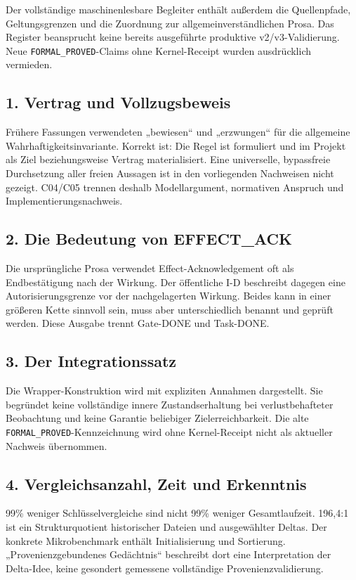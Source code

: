 \vspace{3mm}
Der vollständige maschinenlesbare Begleiter enthält außerdem die Quellenpfade, Geltungsgrenzen und die Zuordnung zur allgemeinverständlichen Prosa. Das Register beansprucht keine bereits ausgeführte produktive v2/v3-Validierung. Neue \texttt{FORMAL\_PROVED}-Claims ohne Kernel-Receipt wurden ausdrücklich vermieden.

\begin{cols}
\subsection*{1. Vertrag und Vollzugsbeweis}
Frühere Fassungen verwendeten „bewiesen“ und „erzwungen“ für die allgemeine Wahrhaftigkeitsinvariante. Korrekt ist: Die Regel ist formuliert und im Projekt als Ziel beziehungsweise Vertrag materialisiert. Eine universelle, bypassfreie Durchsetzung aller freien Aussagen ist in den vorliegenden Nachweisen nicht gezeigt. C04/C05 trennen deshalb Modellargument, normativen Anspruch und Implementierungsnachweis.

\subsection*{2. Die Bedeutung von EFFECT\_ACK}
Die ursprüngliche Prosa verwendet Effect-Acknowledgement oft als Endbestätigung nach der Wirkung. Der öffentliche I-D beschreibt dagegen eine Autorisierungsgrenze vor der nachgelagerten Wirkung. Beides kann in einer größeren Kette sinnvoll sein, muss aber unterschiedlich benannt und geprüft werden. Diese Ausgabe trennt Gate-DONE und Task-DONE.

\subsection*{3. Der Integrationssatz}
Die Wrapper-Konstruktion wird mit expliziten Annahmen dargestellt. Sie begründet keine vollständige innere Zustandserhaltung bei verlustbehafteter Beobachtung und keine Garantie beliebiger Zielerreichbarkeit. Die alte \texttt{FORMAL\_PROVED}-Kennzeichnung wird ohne Kernel-Receipt nicht als aktueller Nachweis übernommen.

\subsection*{4. Vergleichsanzahl, Zeit und Erkenntnis}
99\% weniger Schlüsselvergleiche sind nicht 99\% weniger Gesamtlaufzeit. 196,4:1 ist ein Strukturquotient historischer Dateien und ausgewählter Deltas. Der konkrete Mikrobenchmark enthält Initialisierung und Sortierung. „Provenienzgebundenes Gedächtnis“ beschreibt dort eine Interpretation der Delta-Idee, keine gesondert gemessene vollständige Provenienzvalidierung.


\end{cols}
